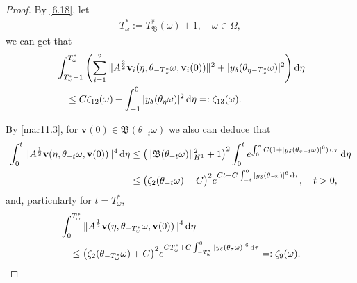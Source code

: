 \documentclass{elsarticle}
\theoremstyle{definition}
\numberwithin{equation}{section}
\renewcommand{\d}{{\rm{d}}}
\begin{document}
\begin{proof}
By \eqref{6.18},   let
\begin{align*}
T_\omega^* :=T_{\mathfrak B}^* (\omega)+1, \quad \omega\in \Omega,
\end{align*}
we can get that
\begin{align}
 & \int_{T_\omega^* -1}^{T_\omega^* }  \left ( \sum_{i=1}^2\|A^\frac32\textbf{v}_i(\eta,\theta_{-T_\omega^* }\omega,\textbf{v}_{i}(0))\|^2+|y_\delta(\theta_{\eta-T_\omega^* }\omega)|^2\right)  \d \eta  \nonumber\\
 &\quad
 \leq  C\zeta_{12}(\omega) + \int_{-1}^0 |y_\delta(\theta_{\eta}\omega)|^2 \, \d \eta =: \zeta_{13}(\omega) . \label{7.2}
 \end{align}



By \eqref{mar11.3},  for   $\textbf{v}(0) \in \mathfrak B(\theta_{-t}\omega)$ we also can deduce that
 \begin{align*}
 \int_0^t
 \|A^{\frac 12} \textbf{v}(\eta, \theta_{-t} \omega, \textbf{v}(0))\|^4 \, \d \eta
 &   \leq  \left( \| \mathfrak B  (\theta_{-t}\omega)\|^2_{H^1} +1 \right)^2 \int_0^t e^{ \int^\eta_0 C(1+|y_\delta(\theta_{\tau-t} \omega)|^6) \, \d \tau}  \, \d \eta \nonumber \\
 &   \leq  \big( \zeta_2(\theta_{-t}\omega)  +C \big)^2  e^{ Ct+C \int^0_{-t}  |y_\delta(\theta_{\tau} \omega)|^6 \, \d \tau}   ,
   \quad t>0  , \nonumber
\end{align*}
and, particularly for $t=T_\omega^*$,
 \begin{align}\label{7.3}
 & \int_0^{T_\omega^*}
 \|A^{\frac 12} \textbf{v}(\eta, \theta_{-{T_\omega^*}} \omega, \textbf{v}(0))\|^4 \, \d \eta \nonumber \\
 &   \quad  \leq  \big( \zeta_2(\theta_{-{T_\omega^*}}\omega)  +C \big)^2  e^{ C {T_\omega^*}+C \int^0_{-{T_\omega^*}}  |y_\delta(\theta_{\tau} \omega)|^6 \, \d \tau} =:\zeta_9(\omega).
\end{align}


\end{proof}
\end{document}
